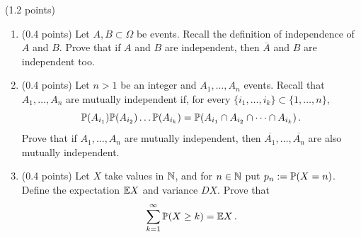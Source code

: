 \documentclass[a4paper]{report}
\begin{document}
\begin{problem}(1.2 points)
\begin{enumerate}
    \item (0.4 points) Let $A,B\subset\Omega$ be events. Recall the definition of
    independence of $A$ and $B$. Prove that if $A$ and $B$ are independent, then $\overline A$ and
    $B$ are independent too.

    \item (0.4 points) Let $n>1$ be an integer and $A_1,\dots,A_n$ events. Recall that $A_1,\dots,A_n$
    are mutually independent if, for every $\{i_1,\dots,i_k\}\subset\{1,\dots,n\}$,
    \begin{equation}\label{ind}
    \P(A_{i_1})\P(A_{i_2}) \dots \P(A_{i_k}) = \P(A_{i_1} \cap A_{i_2} \cap \dots \cap A_{i_k})
    \, .
    \end{equation}Prove that if $A_1,\dots,A_n$ are mutually independent,
    then $\overline{A_1},\dots,\overline{A_n}$ are also mutually independent.


    \item (0.4 points) Let $X$ take values in $\N$, and for $n\in\N$ put
    $p_n:=\P(X=n)$. Define the expectation $\E X$ and variance $D X$. Prove that
    \begin{equation}\label{last}
    \sum_{k = 1}^\infty \P(X \geq k) = \E X \, .
    \end{equation}
\end{enumerate}


\end{problem}
\end{document}
